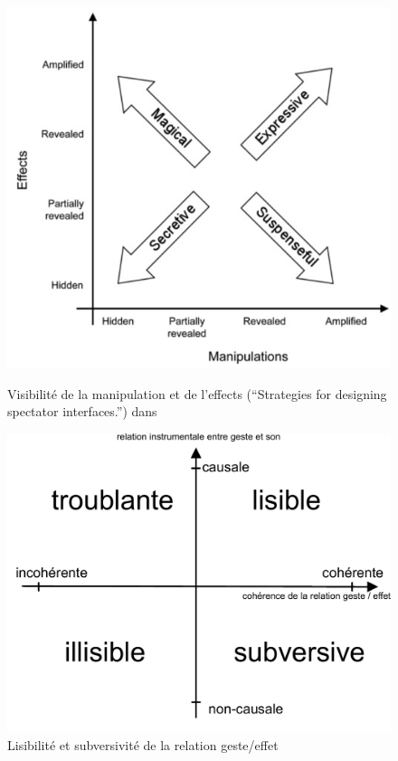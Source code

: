 \begin{figure}[!htbp]
	\captionsetup{format=plain}%
	\centering
	\begin{minipage}[t]{0.48\textwidth}
		\includegraphics[width=\linewidth]{gfx/03_gesture/Benford_ManipulationVsEffects.png}
		\caption{Visibilité de la manipulation et de l'effects (``Strategies for designing spectator interfaces.'') dans \cite{benford_performing_2010}}
		\label{fig:gesture:Benford}
	\end{minipage}
	\hspace{.02\linewidth}
	\begin{minipage}[t]{0.48\textwidth}
	  \includegraphics[width=\linewidth]{gfx/03_gesture/CoherenceVsCausalite.pdf}
		\caption{Lisibilité et subversivité de la relation geste/effet}
		\label{fig:gesture:lisibility_subversion}
	\end{minipage}
\end{figure}



